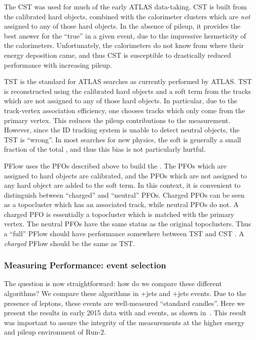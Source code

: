 The CST \met was used for much of the early ATLAS data-taking.
CST \met is built from the calibrated hard objects, combined with the calorimeter clusters which are \textit{not} assigned to any of those hard objects.
In the absence of pileup, it provides the best answer for the ``true'' \met in a given event, due to the impressive hermeticity of the calorimeters.
Unfortunately, the calorimeters do not know from where their energy deposition came, and thus CST is susceptible to drastically reduced performance with increasing pileup.

TST \met is the standard for ATLAS searches as currently performed by ATLAS.
TST \met is reconstructed using the calibrated hard objects and a soft term from the tracks which are not assigned to any of those hard objects.
In particular, due to the track-vertex association efficiency, one chooses tracks which only come from the primary vertex.
This reduces the pileup contributions to the \met measurement.
However, since the ID tracking system is unable to detect neutral objects, the TST \met is ``wrong''.
In most searches for new physics, the soft \met is generally a small fraction of the total \met, and thus this bias is not particularly hurtful.

PFlow \met uses the PFOs described above to build the \met.
The PFOs which are assigned to hard objects are calibrated, and the PFOs which are not assigned to any hard object are added to the soft term.
In this context, it is convenient to distinguish between ``charged'' and ``neutral'' PFOs.
Charged PFOs can be seen as a topocluster which has an associated track, while neutral PFOs do not.
A charged PFO is essentially a topocluster which is matched with the primary vertex.
The neutral PFOs have the same status as the original topoclusters.
Thus a ``full'' PFlow \met should have performance somewhere between TST \met and CST \met\footnotemark.
A \textit{charged} PFlow \met should be the same as TST.


\subsubsection{Measuring \met Performance: event selection}
\label{subsubsec:met_event_selection}
The question is now straightforward: how do we compare these different algorithms?
We compare these algorithms in \Zll+jets and \Wln+jets events.
Due to the presence of leptons, these events are well-measured ``standard candles''.
Here we present the results in early 2015 data with \Zmm and \Wen events, as shown in~\cite{ATL-PHYS-PUB-2015-023,ATL-PHYS-PUB-2015-027}.
This result was important to assure the integrity of the \met measurements at the higher energy and pileup environment of Run-2.

